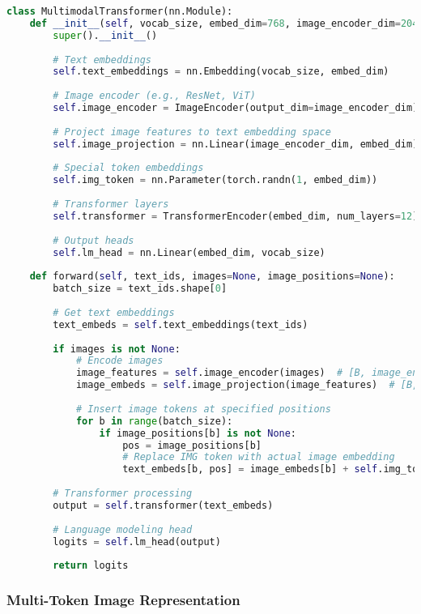 \begin{lstlisting}[language=Python, caption=Single image token integration in multimodal transformer]
class MultimodalTransformer(nn.Module):
    def __init__(self, vocab_size, embed_dim=768, image_encoder_dim=2048):
        super().__init__()
        
        # Text embeddings
        self.text_embeddings = nn.Embedding(vocab_size, embed_dim)
        
        # Image encoder (e.g., ResNet, ViT)
        self.image_encoder = ImageEncoder(output_dim=image_encoder_dim)
        
        # Project image features to text embedding space
        self.image_projection = nn.Linear(image_encoder_dim, embed_dim)
        
        # Special token embeddings
        self.img_token = nn.Parameter(torch.randn(1, embed_dim))
        
        # Transformer layers
        self.transformer = TransformerEncoder(embed_dim, num_layers=12)
        
        # Output heads
        self.lm_head = nn.Linear(embed_dim, vocab_size)
    
    def forward(self, text_ids, images=None, image_positions=None):
        batch_size = text_ids.shape[0]
        
        # Get text embeddings
        text_embeds = self.text_embeddings(text_ids)
        
        if images is not None:
            # Encode images
            image_features = self.image_encoder(images)  # [B, image_encoder_dim]
            image_embeds = self.image_projection(image_features)  # [B, embed_dim]
            
            # Insert image tokens at specified positions
            for b in range(batch_size):
                if image_positions[b] is not None:
                    pos = image_positions[b]
                    # Replace IMG token with actual image embedding
                    text_embeds[b, pos] = image_embeds[b] + self.img_token.squeeze(0)
        
        # Transformer processing
        output = self.transformer(text_embeds)
        
        # Language modeling head
        logits = self.lm_head(output)
        
        return logits
\end{lstlisting}

\subsubsection{Multi-Token Image Representation}


